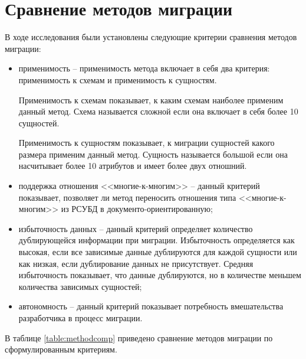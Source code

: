 \section{Сравнение методов миграции}
В ходе исследования были установлены следующие критерии сравнения методов миграции:
\begin{itemize}[label=---]
    \item применимость -- применимость метода включает в себя два критерия: применимость к схемам и применимость к сущностям.
    
    Применимость к схемам показывает, к каким схемам наиболее применим данный метод.
    Схема называется сложной если она включает в себя более 10 сущностей.

    Применимость к сущностям показывает, к миграции сущностей какого размера применим данный метод.
    Сущность называется большой если она насчитывает более 10 атрибутов и имеет более двух отношний.
    \item поддержка отношения <<многие-к-многим>> -- данный критерий показывает,
    позволяет ли метод переносить отношения типа <<многие-к-многим>> из РСУБД в документо-ориентированную;
    \item избыточность данных -- данный критерий определяет количество дублирующейся информации при миграции.
    Избыточность определяется как высокая, если все зависимые данные дублируются для каждой сущности или как низкая, если дублирование данных не присутствует.
    Средняя избыточность показывает, что данные дублируются, но в количестве меньшем количества зависимых сущностей;
    \item автономность -- данный критерий показывает потребность вмешательства разработчика в процесс миграции.
\end{itemize}

\clearpage
 
В таблице \ref{table:methodcomp} приведено сравнение методов миграции по сформулированным критериям.

